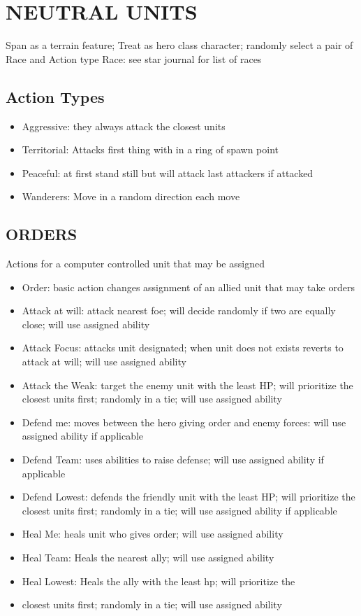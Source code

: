 \section{NEUTRAL UNITS}
Span as a terrain feature; Treat as hero class character; randomly select a pair of Race and Action type
Race: see star journal for list of races
\subsection{Action Types}
\begin{itemize}
\item Aggressive: they always attack the closest units
\item Territorial: Attacks first thing with in a ring of spawn point
\item Peaceful: at first stand still but will attack last attackers if attacked
\item Wanderers: Move in a random direction each move
\end{itemize}
\subsection{ORDERS}
Actions for a computer controlled unit that may be assigned
\begin{itemize}
\item Order: basic action changes assignment of an allied unit that may take orders
\item Attack at will: attack nearest foe; will decide randomly if two are equally close; will use assigned ability
\item Attack Focus: attacks unit designated; when unit does not exists reverts to attack at will; will use assigned ability
\item Attack the Weak: target the enemy unit with the least HP; will prioritize the closest units first; randomly in a tie; will use assigned ability
\item Defend me: moves between the hero giving order and enemy forces: will use assigned ability if applicable
\item Defend Team: uses abilities to raise defense; will use assigned ability if applicable
\item Defend Lowest:  defends the friendly unit with the least HP; will prioritize the closest units first; randomly in a tie; will use assigned ability if applicable
\item Heal Me: heals unit who gives order; will use assigned ability 
\item Heal Team: Heals the nearest ally; will use assigned ability
\item Heal Lowest: Heals the ally with the least hp; will prioritize the \item closest units first; randomly in a tie; will use assigned ability
\end{itemize}

